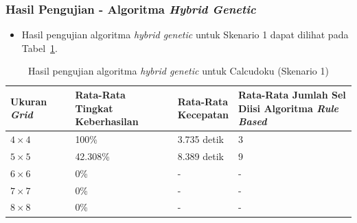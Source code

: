 \documentclass{beamer}
\begin{document}
\begin{frame}
\frametitle{Hasil Pengujian - Algoritma \textit{Hybrid Genetic}}
\begin{itemize}
\item Hasil pengujian algoritma \textit{hybrid genetic} untuk Skenario 1 dapat dilihat pada Tabel~\ref{tab:pengujianhg1}.
\end{itemize}
\begin{table}
\tiny
\centering
\captionsetup{justification=centering}
\caption[Hasil pengujian algoritma \textit{hybrid genetic} untuk Calcudoku (Skenario 1)]{Hasil pengujian algoritma \textit{hybrid genetic} untuk Calcudoku (Skenario 1)}
\begin{tabular}{| l | l | l | l |}
\hline
Ukuran \textit{Grid} & \makecell[c]{Rata-Rata \\ Tingkat Keberhasilan} & \makecell[c]{Rata-Rata \\ Kecepatan} & \makecell[c]{Rata-Rata Jumlah Sel \\ Diisi Algoritma \textit{Rule Based}} \\
\hline \hline
\begin{math}4 \times 4\end{math} & 100\% & 3.735 detik & 3 \\
\hline
\begin{math}5 \times 5\end{math} & 42.308\% & 8.389 detik & 9 \\
\hline
\begin{math}6 \times 6\end{math} & 0\% & - & - \\
\hline
\begin{math}7 \times 7\end{math} & 0\% & - & - \\
\hline
\begin{math}8 \times 8\end{math} & 0\% & - & - \\
\hline
\end{tabular}
\label{tab:pengujianhg1}
\end{table}
\end{frame}

\end{document}
